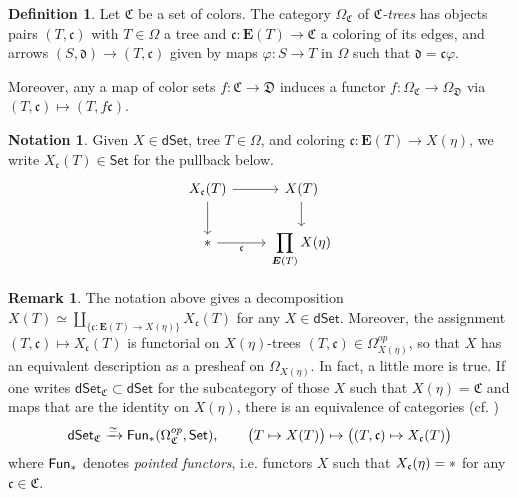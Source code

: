 \documentclass[a4paper,10pt
,draft
]{article}%
\numberwithin{equation}{section}
\numberwithin{figure}{section}
\theoremstyle{definition} %
\newtheorem{definition}[equation]{Definition}%
\newtheorem{remark}[equation]{Remark}%
\newtheorem{notation}[equation]{Notation}%
\newcommand{\Set}{\ensuremath{\mathsf{Set}}}
\newcommand{\dSet}{\mathsf{dSet}}
\newcommand{\Fun}{\mathsf{Fun}}
\newcommand{\1}{\ensuremath{\mathbbm 1}}%
\begin{document}
\begin{definition}\label{CTREE_DEF}
	Let $\mathfrak C$ be a set of colors.
	The category $\Omega_{\mathfrak C}$ of \textit{$\mathfrak C$-trees} has objects pairs $(T, \mathfrak c)$ with 
	$T \in \Omega$ a tree and
	$\mathfrak c \colon \boldsymbol{E}(T) \to \mathfrak C$ a coloring of its edges,
	and arrows
	$(S, \mathfrak d) \to (T, \mathfrak c)$
	given by maps
	$\varphi \colon S \to T$ in $\Omega$ such that $\mathfrak d = \mathfrak c \varphi$.
	
	Moreover, any a map of color sets
	$f \colon \mathfrak C \to \mathfrak D$
	induces a functor
	$f\colon \Omega_{\mathfrak{C}} \to \Omega_{\mathfrak{D}}$
	via
	$(T,\mathfrak{c}) \mapsto (T,f\mathfrak{c})$.
\end{definition}



\begin{notation}\label{MAPSOVCOL NOT}
	Given $X \in \dSet$, tree $T \in \Omega$, 
	and coloring $\mathfrak c \colon \boldsymbol{E}(T) \to X(\eta)$,
	we write $X_{\mathfrak c}(T) \in \Set$ for the pullback below.
	\begin{equation}
	\label{XUDECALT EQ}
	\begin{tikzcd}
	X_{\mathfrak c}(T) \arrow[r] \arrow[d]
	&
	X(T) \arrow[d]
	\\
	\** \arrow{r}[swap]{\mathfrak c}
	&
	\displaystyle{
		\prod\limits_{\boldsymbol{E}(T)} X(\eta)
	}
	\end{tikzcd}
	\end{equation}
\end{notation}




\begin{remark}
	The notation above gives a decomposition
	$X(T) \simeq \coprod_{\{\mathfrak c \colon \boldsymbol{E}(T) \to X(\eta)\}} X_{\mathfrak c}(T)$
	for any $X\in \dSet$.
	Moreover, the assignment
	$(T,\mathfrak c) \mapsto X_{\mathfrak{c}}(T)$ 
	is functorial on
	$X(\eta)$-trees $(T,\mathfrak c) \in \Omega^{op}_{X(\eta)}$,
	so that $X$ has an equivalent description
	as a presheaf on $\Omega_{X(\eta)}$.
	In fact, a little more is true. 
	If one writes 
	$\mathsf{dSet}_{\mathfrak{C}} \subset \dSet$
	for the subcategory of those $X$ such that
	$X(\eta) = \mathfrak{C}$ and maps that are the identity on 
	$X(\eta)$, there is an equivalence of categories ({cf. \cite[ \eqref{TAS-PREOPCOLFIXEQ EQ}]{BP_TAS}})
\begin{equation}\label{DSETCID EQ}
\dSet_{\mathfrak C} \xrightarrow{\simeq}
 \Fun_{\**}(\Omega_{\mathfrak C}^{op}, \Set),
\qquad
\big(T \mapsto X(T)\big) \mapsto \big( (T, \mathfrak c) \mapsto X_{\mathfrak c}(T) \big)
\end{equation}
where $\Fun_{\**}$ denotes \emph{pointed functors},
i.e. functors $X$ such that
$X_{\mathfrak c}(\eta) = \**$
for any $\mathfrak{c} \in \mathfrak{C}$.
\end{remark}
\end{document}
